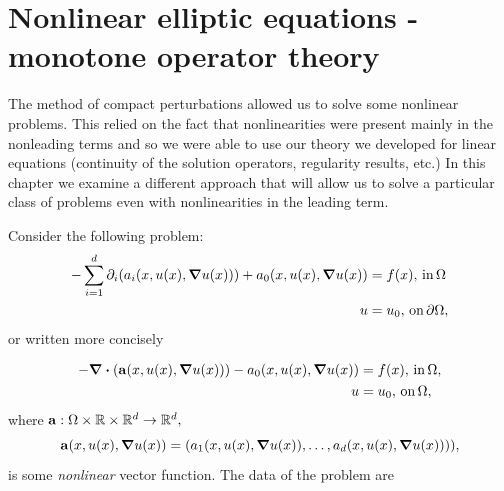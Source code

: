 \documentclass{article}
\begin{document}
\section{Nonlinear elliptic equations - monotone operator theory}
\label{sec:monotone_operator}

The method of compact perturbations allowed us to solve some nonlinear problems. This relied on the fact that nonlinearities were present mainly in the nonleading terms and so we were able to use our theory we developed for linear equations (continuity of the solution operators, regularity results, etc.) In this chapter we examine a different approach that will allow us to solve a particular class of problems even with nonlinearities in the leading term.

Consider the following problem:
\begin{align*}
	- \sum_{i=1}^d \partial_{i}\qty(a_i\qty(x,u(x),\grad u(x))) + a_0\qty(x,u(x),\grad u(x)) &= f(x), \, \text{in} \, \Omega \\
	u &= u_0,  \, \text{on} \, \partial \Omega,
\end{align*}
or written more concisely

\begin{align*}
	- \divergence{\qty(\vb{a}\qty(x, u(x), \grad u(x)))} - a_0\qty(x, u(x), \grad u(x)) &= f(x), \, \text{in} \, \Omega, \\
	u &= u_0, \, \text{on} \, \Omega,
\end{align*}
where $\vb{a}: \Omega \times {\mathbb R} \times {\mathbb R}^{d} \to {\mathbb R}^d,$
\[
	\vb{a}\qty(x, u(x), \grad u(x)) = \qty(a_1\qty(x, u(x), \grad u(x)), \dots, a_d\qty(x, u(x), \grad u(x)))),
\]
is some \textit{nonlinear} vector function. The data of the problem are
\end{document}
